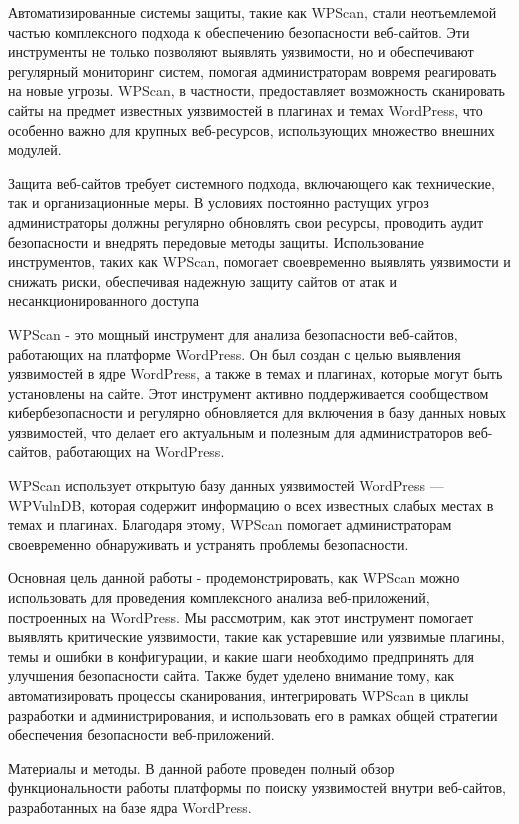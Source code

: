 \begin{multicols}{2}
Автоматизированные системы защиты, такие как WPScan, стали неотъемлемой
частью комплексного подхода к обеспечению безопасности веб-сайтов. Эти
инструменты не только позволяют выявлять уязвимости, но и обеспечивают
регулярный мониторинг систем, помогая администраторам вовремя
реагировать на новые угрозы. WPScan, в частности, предоставляет
возможность сканировать сайты на предмет известных уязвимостей в
плагинах и темах WordPress, что особенно важно для крупных веб-ресурсов,
использующих множество внешних модулей.

Защита веб-сайтов требует системного подхода, включающего как
технические, так и организационные меры. В условиях постоянно растущих
угроз администраторы должны регулярно обновлять свои ресурсы, проводить
аудит безопасности и внедрять передовые методы защиты. Использование
инструментов, таких как WPScan, помогает своевременно выявлять
уязвимости и снижать риски, обеспечивая надежную защиту сайтов от атак и
несанкционированного доступа

WPScan - это мощный инструмент для анализа безопасности веб-сайтов,
работающих на платформе WordPress. Он был создан с целью выявления
уязвимостей в ядре WordPress, а также в темах и плагинах, которые могут
быть установлены на сайте. Этот инструмент активно поддерживается
сообществом кибербезопасности и регулярно обновляется для включения в
базу данных новых уязвимостей, что делает его актуальным и полезным для
администраторов веб-сайтов, работающих на WordPress.

WPScan использует открытую базу данных уязвимостей WordPress ---
WPVulnDB, которая содержит информацию о всех известных слабых местах в
темах и плагинах. Благодаря этому, WPScan помогает администраторам
своевременно обнаруживать и устранять проблемы безопасности.

Основная цель данной работы - продемонстрировать, как WPScan можно
использовать для проведения комплексного анализа веб-приложений,
построенных на WordPress. Мы рассмотрим, как этот инструмент помогает
выявлять критические уязвимости, такие как устаревшие или уязвимые
плагины, темы и ошибки в конфигурации, и какие шаги необходимо
предпринять для улучшения безопасности сайта. Также будет уделено
внимание тому, как автоматизировать процессы сканирования, интегрировать
WPScan в циклы разработки и администрирования, и использовать его в
рамках общей стратегии обеспечения безопасности веб-приложений.

Материалы и методы. В данной работе проведен полный обзор
функциональности работы платформы по поиску уязвимостей внутри
веб-сайтов, разработанных на базе ядра WordPress.


\end{multicols}
